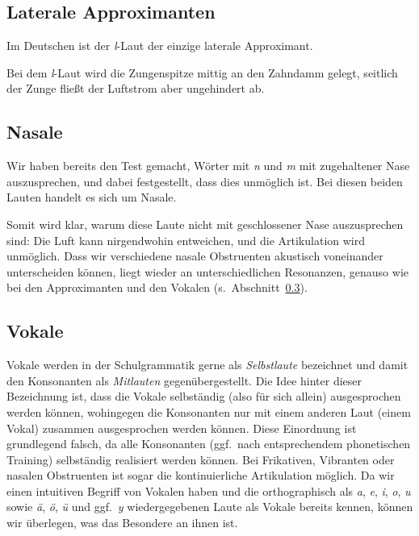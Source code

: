 \subsection{Laterale Approximanten}

Im Deutschen ist der \textit{l}-Laut der einzige laterale Approximant.


Bei dem \textit{l}-Laut wird die Zungenspitze mittig an den Zahndamm gelegt, seitlich der Zunge fließt der Luftstrom aber ungehindert ab.


\subsection{Nasale}

Wir haben bereits den Test gemacht, Wörter mit \textit{n} und \textit{m} mit zugehaltener Nase auszusprechen, und dabei festgestellt, dass dies unmöglich ist.
Bei diesen beiden Lauten handelt es sich um Nasale.


Somit wird klar, warum diese Laute nicht mit geschlossener Nase auszusprechen sind:
Die Luft kann nirgendwohin entweichen, und die Artikulation wird unmöglich.
Dass wir verschiedene nasale Obstruenten akustisch voneinander unterscheiden können, liegt wieder an unterschiedlichen Resonanzen, genauso wie bei den Approximanten und den Vokalen (s.\ Abschnitt~\ref{sec:vokale}).

\subsection{Vokale}

\label{sec:vokale}

Vokale werden in der Schulgrammatik gerne als \textit{Selbstlaute} bezeichnet und damit den Konsonanten als \textit{Mitlauten} gegenübergestellt.
Die Idee hinter dieser Bezeichnung ist, dass die Vokale selbständig (also für sich allein) ausgesprochen werden können, wohingegen die Konsonanten nur mit einem anderen Laut (einem Vokal) zusammen ausgesprochen werden können.
Diese Einordnung ist grundlegend falsch, da alle Konsonanten (ggf.\ nach entsprechendem phonetischen Training) selbständig realisiert werden können.
Bei Frikativen, Vibranten oder nasalen Obstruenten ist sogar die kontinuierliche Artikulation möglich.
Da wir einen intuitiven Begriff von Vokalen haben und die orthographisch als \textit{a}, \textit{e}, \textit{i}, \textit{o}, \textit{u} sowie \textit{ä}, \textit{ö}, \textit{ü} und ggf.\ \textit{y} wiedergegebenen Laute als Vokale bereits kennen, können wir überlegen, was das Besondere an ihnen ist.

